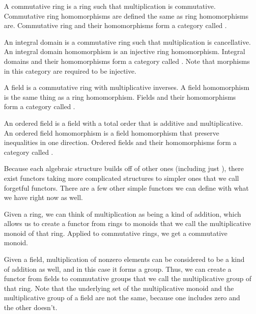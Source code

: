 \documentclass[../math.tex]{subfiles}
\begin{document}
\begin{definition}
    A commutative ring is a ring such that multiplication is commutative.
    Commutative ring homomorphisms are defined the same as ring homomorphisms
    are.  Commutative ring and their homomorphisms form a category called
    .
\end{definition}

\begin{definition}
    An integral domain is a commutative ring such that multiplication is
    cancellative.  An integral domain homomorphism is an injective ring
    homomorphism.  Integral domains and their homomorphisms form a category
    called .  Note that morphisms in this category are required to
    be injective.
\end{definition}

\begin{definition}
    A field is a commutative ring with multiplicative inverses.  A field
    homomorphism is the same thing as a ring homomorphism.  Fields and their
    homomorphisms form a category called .
\end{definition}

\begin{definition}
    An ordered field is a field with a total order that is additive and
    multiplicative.  An ordered field homomorphism is a field homomorphism that
    preserve inequalities in one direction.  Ordered fields and their
    homomorphisms form a category called .
\end{definition}

Because each algebraic structure builds off of other ones (including just
\Type), there exist functors taking more complicated structures to simpler ones
that we call forgetful functors.  There are a few other simple functors we can
define with what we have right now as well.

\begin{definition}
    Given a ring, we can think of multiplication as being a kind of addition,
    which allows us to create a functor from rings to monoids that we call the
    multiplicative monoid of that ring.  Applied to commutative rings, we get a
    commutative monoid.
\end{definition}

\begin{definition}
    Given a field, multiplication of nonzero elements can be considered to be a
    kind of addition as well, and in this case it forms a group.  Thus, we can
    create a functor from fields to commutative groups that we call the
    multiplicative group of that ring.  Note that the underlying set of the
    multiplicative monoid and the multiplicative group of a field are not the
    same, because one includes zero and the other doesn't.
\end{definition}
\end{document}
